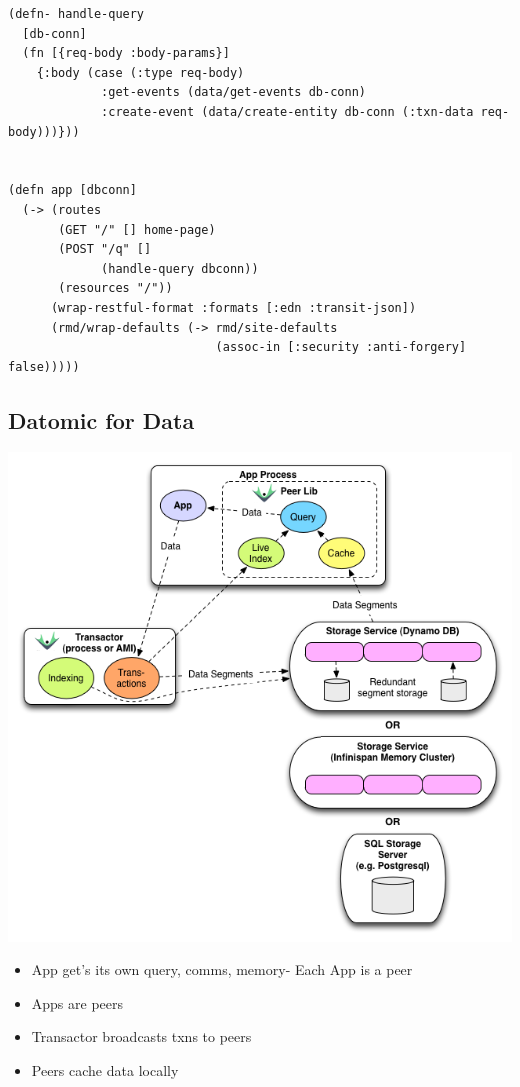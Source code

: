 \documentclass[11pt]{article}
\begin{document}
\begin{verbatim}
(defn- handle-query
  [db-conn]
  (fn [{req-body :body-params}]
    {:body (case (:type req-body)
             :get-events (data/get-events db-conn)
             :create-event (data/create-entity db-conn (:txn-data req-body)))}))


(defn app [dbconn]
  (-> (routes
       (GET "/" [] home-page)
       (POST "/q" []
             (handle-query dbconn))
       (resources "/"))
      (wrap-restful-format :formats [:edn :transit-json])
      (rmd/wrap-defaults (-> rmd/site-defaults
                             (assoc-in [:security :anti-forgery] false)))))
\end{verbatim}

\subsection*{Datomic for Data}
\label{sec:orgheadline27}

\includegraphics[width=.9\linewidth]{./datomic-architecture.png}

\begin{itemize}
\item App get's its own query, comms, memory- Each App is a peer
\end{itemize}

\begin{NOTES}
\begin{itemize}
\item Apps are peers
\item Transactor broadcasts txns to peers
\item Peers cache data locally
\end{itemize}
\end{NOTES}
\end{document}
